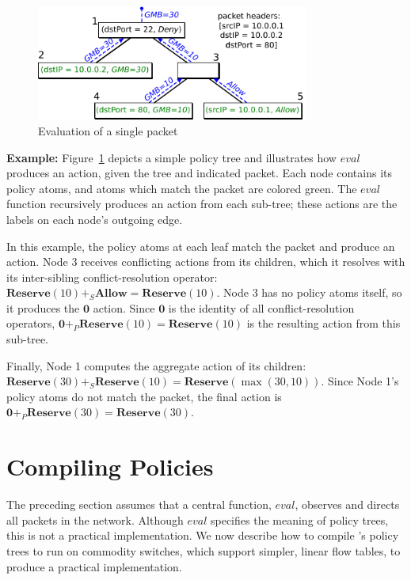 \begin{figure}
\centering
\includegraphics[width=0.8\textwidth]{figs/evaltree}
\caption{Evaluation of a single packet}
\label{f:evaltree}
\end{figure}


\vspace{0.5em}\noindent\textbf{Example:\space}
Figure~\ref{f:evaltree} depicts a simple policy tree
and illustrates how $\mathit{eval}$ produces an action, given the 
tree and indicated packet.
Each node contains its policy atoms, and atoms which match the packet are colored
green. The $\mathit{eval}$ function recursively produces an action from
each sub-tree; these actions are the labels on each node's outgoing edge.

In this example, the policy atoms at each leaf match the packet and produce
an action.
Node $3$ receives conflicting actions
from its children, which it resolves with its inter-sibling
conflict-resolution operator:
$\textbf{Reserve}(10)
+_S \textbf{Allow} = \textbf{Reserve}(10)$. Node $3$ has no policy atoms
itself, so it produces the $\textbf{0}$ action. Since $\textbf{0}$ is
the identity of all conflict-resolution operators,
  $\textbf{0} +_P \textbf{Reserve}(10) = \textbf{Reserve}(10)$ is the
resulting action from this sub-tree. 

Finally, Node 1 computes the aggregate action of its children:
$\textbf{Reserve}(30) +_S \textbf{Reserve}(10) = \textbf{Reserve}(\max(30,10))$.
Since Node 1's policy atoms do not match the packet,
the final action is
$\textbf{0} +_P \textbf{Reserve}(30) = \textbf{Reserve}(30)$.


\section{Compiling Policies}\label{s:lin}

The preceding section assumes that a central function,
$\mathit{eval}$, observes and directs all packets in the network.
Although $\mathit{eval}$ specifies the meaning of policy trees, this is not a
practical implementation. We now describe how to compile \treelang's
policy trees to run on commodity switches, which support simpler, linear
flow tables, to produce a practical implementation.

